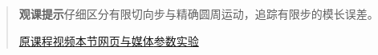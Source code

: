 \begin{quote}\small\textbf{观课提示}\quad 仔细区分有限切向步与精确圆周运动，追踪有限步的模长误差。

\href{https://www.youtube.com/watch?v=IAEASE5GjdI}{原课程视频}\quad\href{https://vitael04213.github.io/3blue1brown-notes/lessons/ldm-imaginary-interest.html}{本节网页与媒体}\quad\href{https://vitael04213.github.io/3blue1brown-notes/lab.html\#complex}{参数实验}
\end{quote}

